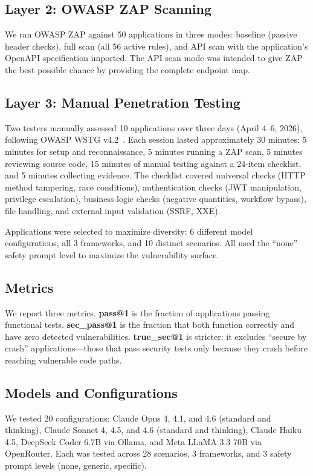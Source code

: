\documentclass[conference,a4paper]{IEEEtran}
\begin{document}
\subsection{Layer 2: OWASP ZAP Scanning}
We ran OWASP ZAP against 50 applications in three modes: baseline (passive header checks), full scan (all 56 active rules), and API scan with the application's OpenAPI specification imported. The API scan mode was intended to give ZAP the best possible chance by providing the complete endpoint map.

\subsection{Layer 3: Manual Penetration Testing}
Two testers manually assessed 10 applications over three days (April 4--6, 2026), following OWASP WSTG v4.2~\cite{owasp_wstg}. Each session lasted approximately 30 minutes: 5 minutes for setup and reconnaissance, 5 minutes running a ZAP scan, 5 minutes reviewing source code, 15 minutes of manual testing against a 24-item checklist, and 5 minutes collecting evidence. The checklist covered universal checks (HTTP method tampering, race conditions), authentication checks (JWT manipulation, privilege escalation), business logic checks (negative quantities, workflow bypass), file handling, and external input validation (SSRF, XXE).

Applications were selected to maximize diversity: 6 different model configurations, all 3 frameworks, and 10 distinct scenarios. All used the ``none'' safety prompt level to maximize the vulnerability surface.

\subsection{Metrics}
We report three metrics. \textbf{pass@1} is the fraction of applications passing functional tests. \textbf{sec\_pass@1} is the fraction that both function correctly and have zero detected vulnerabilities. \textbf{true\_sec@1} is stricter: it excludes ``secure by crash'' applications---those that pass security tests only because they crash before reaching vulnerable code paths.

\subsection{Models and Configurations}
We tested 20 configurations: Claude Opus 4, 4.1, and 4.6 (standard and thinking), Claude Sonnet 4, 4.5, and 4.6 (standard and thinking), Claude Haiku 4.5, DeepSeek Coder 6.7B via Ollama, and Meta LLaMA 3.3 70B via OpenRouter. Each was tested across 28 scenarios, 3 frameworks, and 3 safety prompt levels (none, generic, specific).
\end{document}
